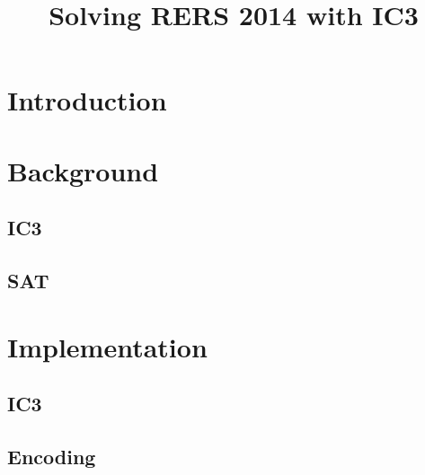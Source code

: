 \documentclass[a4paper]{article}
\begin{document}
\title{Solving RERS 2014 with IC3}
\maketitle

\section{Introduction}



\section{Background}
\subsection{IC3}
\subsection{SAT}
\section{Implementation}
\subsection{IC3}
\subsection{Encoding} %
\end{document}
